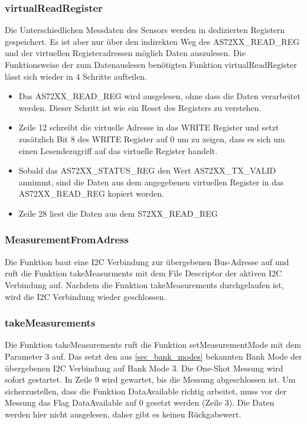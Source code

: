 \subsubsection{virtualReadRegister}
Die Unterschiedlichen Messdaten des Sensors werden in dedizierten Registern gespeichert.
 Es ist aber nur über den indirekten Weg des AS72XX\_READ\_REG und der virtuellen Registeradressen möglich Daten auszulesen.
Die Funktionsweise der zum Datenauslesen benötigten Funktion virtualReadRegister lässt sich wieder in 4 Schritte aufteilen.
\begin{itemize}
	\item Das AS72XX\_READ\_REG wird ausgelesen, ohne dass die Daten verarbeitet werden. Dieser Schritt ist wie ein Reset des Registers zu verstehen.
	\item Zeile 12 schreibt die virtuelle Adresse in das WRITE Register und setzt zusätzlich Bit 8 des WRITE Register auf 0 um zu zeigen, dass es sich um einen Lesendezugriff auf das virtuelle Register handelt.
	\item Sobald das AS72XX\_STATUS\_REG den Wert AS72XX\_TX\_VALID annimmt, sind die Daten aus dem angegebenen virtuellen Register in das AS72XX\_READ\_REG kopiert worden.
	\item Zeile 28 liest die Daten aus dem S72XX\_READ\_REG
\end{itemize}


\subsubsection{MeasurementFromAdress}
Die Funktion baut eine I2C Verbindung zur übergebenen Bus-Adresse auf und  ruft die Funktion takeMeasurments mit dem File Descriptor der aktiven I2C Verbindung auf.
Nachdem die Funktion takeMeasurements durchgelaufen ist, wird die I2C Verbindung wieder geschlossen.


\subsubsection{takeMeasurements}

Die Funktion takeMeasurements ruft die Funktion setMeasurementMode mit dem Parameter 3 auf. Das setzt den aus \ref{sec_bank_modes} bekannten Bank Mode der übergebenen I2C Verbindung auf Bank Mode 3.
	Die One-Shot Messung wird sofort gestartet. In Zeile 9 wird gewartet, bis die Messung abgeschlossen ist. 
		Um sicherzustellen, dass die Funktion DataAvailable richtig arbeitet, muss vor der Messung das Flag DataAvailable auf 0 gesetzt werden (Zeile 3).
Die Daten werden hier nicht ausgelesen, daher gibt es keinen Rückgabewert.\\


